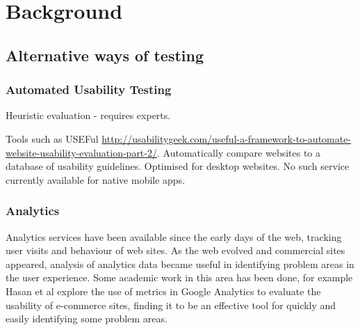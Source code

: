 \chapter{Background}

\section{Alternative ways of testing}

\subsection{Automated Usability Testing}

Heuristic evaluation - requires experts.


Tools such as USEFul \cite{dingli2011useful} \url{http://usabilitygeek.com/useful-a-framework-to-automate-website-usability-evaluation-part-2/}. Automatically compare websites to a database of usability guidelines. Optimised for desktop websites. No such service currently available for native mobile apps.

\subsection{Analytics}

Analytics services have been available since the early days of the web, tracking user visits and behaviour of web sites. As the web evolved and commercial sites appeared, analysis of analytics data became useful in identifying problem areas in the user experience. Some academic work in this area has been done, for example Hasan et al \cite{hasan2009using} explore the use of metrics in Google Analytics to evaluate the usability of e-commerce sites, finding it to be an effective tool for quickly and easily identifying some problem areas.


